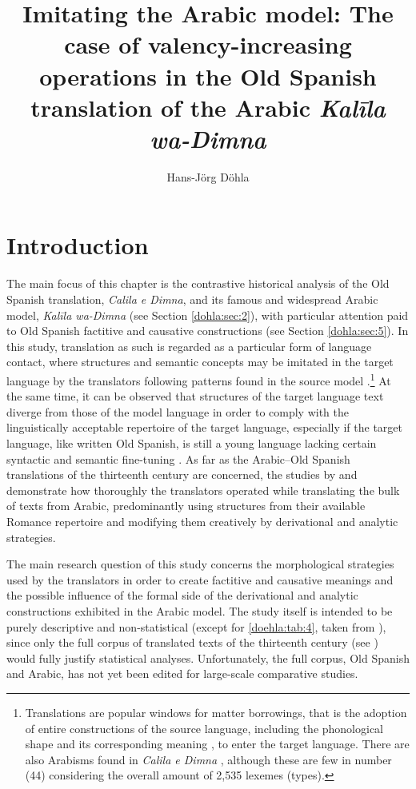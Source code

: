 \documentclass[output=paper]{langscibook}
\author{Hans-Jörg Döhla \orcid{0000-0003-0047-3492} \affiliation{University of Tübingen}}
\title[Imitating the Arabic model]{Imitating the Arabic model: The case of valency-increasing operations in the Old Spanish translation of the Arabic \textit{Kalīla wa-Dimna}}
\begin{document}
\maketitle

\section{Introduction}\label{doehla:sec:1}

The main focus of this chapter is the contrastive historical analysis of the Old Spanish translation, \textit{Calila e Dimna}, and its famous and widespread Arabic model, \textit{Kalīla wa-Dimna} (see Section \ref{dohla:sec:2}), with particular attention paid to Old Spanish factitive and causative constructions (see Section \ref{dohla:sec:5}). In this study, translation as such is regarded as a particular form of language contact, where structures and semantic concepts may be imitated in the target language by the translators following patterns found in the source model \citep{dohla_traduccion_2008-1,hasler_ubersetzung_2001}.\footnote{Translations are popular windows for matter borrowings, that is the adoption of entire constructions of the source language, including the phonological shape and its corresponding meaning \citep[15]{sakel_types_2007}, to enter the target language. There are also Arabisms found in \textit{Calila e Dimna} \citep{dohla_libro_2009}, although these are few in number (44) considering the overall amount of 2,535 lexemes (types).} At the same time, it can be observed that structures of the target language text diverge from those of the model language in order to comply with the linguistically acceptable repertoire of the target language, especially if the target language, like written Old Spanish, is still a young language lacking certain syntactic and semantic fine-tuning \citep{bossong_probleme_1979,galmes_de_fuentes_influencia_1996,huffman_syntactical_1973}. As far as the Arabic–Old Spanish translations of the thirteenth century are concerned, the studies by \citet{bossong_probleme_1979,bossong_creatividad_2008} and \citet{dohla_traduccion_2008-1,dohla_libro_2009} demonstrate how thoroughly the translators operated while translating the bulk of texts from Arabic, predominantly using structures from their available Romance repertoire and modifying them creatively by derivational and analytic strategies. 

The main research question of this study concerns the morphological strategies used by the translators in order to create factitive and causative meanings and the possible influence of the formal side of the derivational and analytic constructions exhibited in the Arabic model.
The study itself is intended to be purely descriptive and non-statistical (except for \autoref{doehla:tab:4}, taken from \citealt{sanaphre_villanueva_analytic_2010}), since only the full corpus of translated texts of the thirteenth century (see \citealt{faulhaber_semitica_2004}) would fully justify statistical analyses. Unfortunately, the full corpus, Old Spanish and Arabic, has not yet been edited for large-scale comparative studies. 
\end{document}
